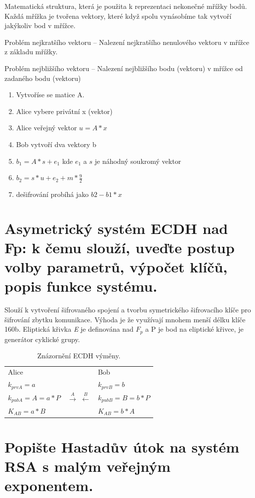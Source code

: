 Matematická struktura, která je použita k reprezentaci nekonečné mřížky bodů. Každá mřížka je tvořena vektory, které když spolu vynásobíme tak vytvoří jakýkoliv bod v mřížce. 

Problém nejkratšího vektoru -- Nalezení nejkratšího nenulového vektoru v mřížce z základu mřížky.

Problém nejbližšího vektoru -- Nalezení nejbližšího bodu (vektoru) v mřížce od zadaného bodu (vektoru)

\begin{enumerate}
    \item Vytvoříse se matice A.
    \item Alice vybere privátní x (vektor)
    \item Alice veřejný vektor $u = A*x$
    \item Bob vytvoří dva vektory b
    \item $b_1 = A*s + e_1$ kde $e_1$ a $s$ je náhodný soukromý vektor
    \item $b_2 = s* u + e_2 + m * \frac{9}{2}$
    \item dešifrování probíhá jako $b2 - b1 * x$
\end{enumerate}

\section{Asymetrický systém ECDH nad Fp: k čemu slouží, uveďte postup volby parametrů, výpočet klíčů, popis funkce systému.}

Slouží k vytvoření šifrovaného spojení a tvorbu symetrického šifrovacího klíče pro šifrování
zbytku komunikace. Výhoda je že využívají mnohem menší délku klíče 160b. Eliptická křivka \textit{E} je definována nad $F_p$ a P je bod na eliptické křivce, je generátor cyklické grupy.

\begin{table}[ht]
\centering
\begin{tabular}{lcl}
Alice && Bob \\
$k_{prvA} = a$ && $k_{prvB} = b$ \\
$k_{pubA} = A = a*P$ & $\stackrel{A}{\rightarrow}$ $\stackrel{B}{\leftarrow}$ & $k_{pubB} = B = b*P$ \\
$K_{AB} = a * B$ && $K_{AB} = b * A$ \\
\end{tabular}
\caption*{Znázornění ECDH výměny.}
\end{table}

\section{Popište Hastadův útok na systém RSA s malým veřejným exponentem.}

